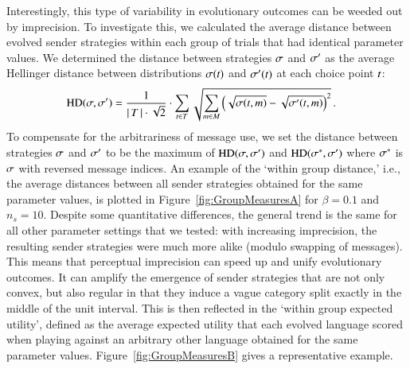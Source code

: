 \documentclass[11pt,english]{article}
\numberwithin{equation}{section}
\begin{document}
Interestingly, this type of variability in evolutionary outcomes can
be weeded out by imprecision. To investigate this, we calculated the average
distance between evolved sender strategies within each group of trials
that had identical parameter values. We determined the distance
between strategies $\sigma$ and $\sigma'$ as the average Hellinger
distance between distributions $\sigma(t)$ and
$\sigma'(t)$ at each choice point $t$:
\begin{align*}
  \text{HD}(\sigma,\sigma') & = \frac{1}{{\left \lvert \, T \, \right\rvert \cdot
     \sqrt{2}}} \cdot  \sum_{t \in T} 
 \sqrt{\sum_{m \in  M}
         \left ( \sqrt{\sigma(t,m)} -
         \sqrt{\sigma'(t,m)} \right )^2 }\,.
\end{align*}
To compensate for the arbitrariness of message use, we set the distance between strategies
$\sigma$ and $\sigma'$ to be the maximum of $\text{HD}(\sigma,\sigma')$ and
$\text{HD}(\sigma^*,\sigma')$ where $\sigma^*$ is $\sigma$ with reversed message
indices. An example of the `within group distance,' i.e., the average distances between
all sender strategies obtained for the same parameter values, is plotted in
Figure~\ref{fig:GroupMeasuresA} for $\beta = 0.1$ and $n_s = 10$. Despite some quantitative
differences, the general trend is the same for all other parameter settings that we tested:
with increasing imprecision, the resulting sender strategies were much more alike (modulo
swapping of messages). This means that perceptual imprecision can speed up and unify
evolutionary outcomes. It can amplify the emergence of sender strategies that are not only
convex, but also regular in that they induce a vague category split exactly in the middle of
the unit interval.
This is then reflected in the `within group expected utility', defined as the average
expected utility that each evolved language scored when playing against an arbitrary other
language obtained for the same parameter values. Figure~\ref{fig:GroupMeasuresB} gives a
representative example.
\end{document}
